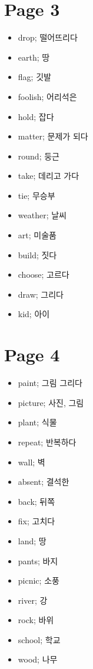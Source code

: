 \documentclass[12pt,a4paper]{article}
\begin{document}
\section*{Page 3}
\begin{itemize}
    \item drop; 떨어뜨리다
    \item earth; 땅
    \item flag; 깃발
    \item foolish; 어리석은
    \item hold; 잡다
    \item matter; 문제가 되다
    \item round; 둥근
    \item take; 데리고 가다
    \item tie; 무승부
    \item weather; 날씨
    \item art; 미술품
    \item build; 짓다
    \item choose; 고르다
    \item draw; 그리다
    \item kid; 아이
\end{itemize}
\newpage

\section*{Page 4}
\begin{itemize}
    \item paint; 그림 그리다
    \item picture; 사진, 그림
    \item plant; 식물
    \item repeat; 반복하다
    \item wall; 벽
    \item absent; 결석한
    \item back; 뒤쪽
    \item fix; 고치다
    \item land; 땅
    \item pants; 바지
    \item picnic; 소풍
    \item river; 강
    \item rock; 바위
    \item school; 학교
    \item wood; 나무
\end{itemize}
\end{document}

